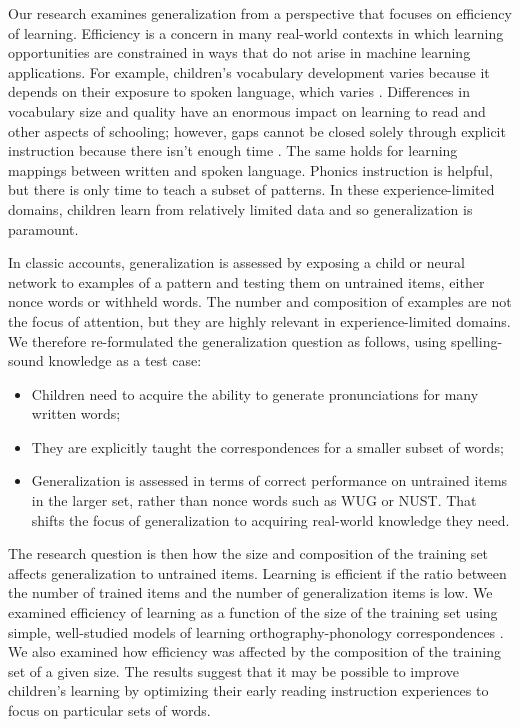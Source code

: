 \documentclass[10pt,letterpaper]{article}
\newcommand{\exword}[1]{\MakeUppercase{#1}}
\begin{document}
Our research examines generalization from a perspective that focuses on efficiency of learning. Efficiency is a concern in many real-world contexts in which learning opportunities are constrained in ways that do not arise in machine learning applications. For example, children's vocabulary development varies because it depends on their exposure to spoken language, which varies \cite{Hart1995}.  Differences in vocabulary size and quality have an enormous impact on learning to read and other aspects of schooling;  however, gaps cannot be closed solely through explicit instruction because there isn't enough time \cite{Seidenberg2017}. The same holds for learning mappings between written and spoken language. Phonics instruction is helpful, but there is only time to teach a subset of patterns. In these experience-limited domains, children learn from relatively limited data and so generalization is paramount.

In classic accounts, generalization is assessed by exposing a child or neural network to examples of a pattern and testing them on untrained items, either nonce words or withheld words. The number and composition of examples are not the focus of attention, but they are highly relevant in experience-limited domains.  We therefore re-formulated the generalization question as follows, using spelling-sound knowledge as a test case: 

\begin{itemize}
	\item Children need to acquire the ability to generate pronunciations for many written words;  
	\item They are explicitly taught the correspondences for a smaller subset of words;
	\item Generalization is assessed in terms of correct performance on untrained items in the larger set, rather than nonce words such as \exword{wug} or \exword{nust}. That shifts the focus of generalization to acquiring real-world knowledge they need.
\end{itemize}

The research question is then how the size and composition of the training set affects generalization to untrained items.  Learning is efficient if the ratio between the number of trained items and the number of generalization items is low. We examined efficiency of learning as a function of the size of the training set using simple, well-studied models of learning orthography-phonology correspondences \cite{Seidenberg1989,Seidenberg2014}. We also examined how efficiency was affected by the composition of the training set of a given size. The results suggest that it may be possible to improve children's learning by optimizing their early reading instruction experiences to focus on particular sets of words.
\end{document}
